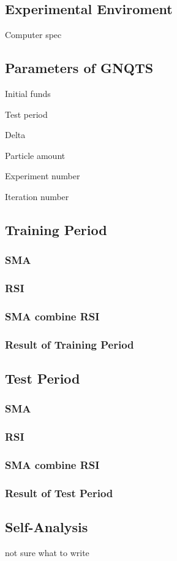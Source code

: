 \documentclass[../main.tex]{subfiles}
\begin{document}
\subsection{Experimental Enviroment}
Computer spec

\subsection{Parameters of GNQTS}
Initial funds

Test period

Delta

Particle amount

Experiment number

Iteration number

\subsection{Training Period}

\subsubsection{SMA}


\subsubsection{RSI}


\subsubsection{SMA combine RSI}


\subsubsection{Result of Training Period}


\subsection{Test Period}


\subsubsection{SMA}


\subsubsection{RSI}


\subsubsection{SMA combine RSI}


\subsubsection{Result of Test Period}


\subsection{Self-Analysis}
not sure what to write
\end{document}
